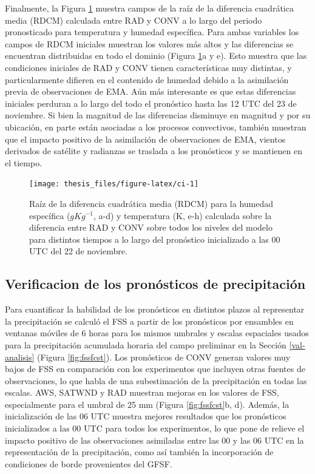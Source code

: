 \documentclass[12pt,oneside,a4paper]{reedthesis}
\begin{document}
Finalmente, la Figura \ref{fig:ci} muestra campos de la raíz de la diferencia cuadrática media (RDCM) calculada entre RAD y CONV a lo largo del periodo pronosticado para temperatura y humedad específica. Para ambas variables los campos de RDCM iniciales muestran los valores más altos y las diferencias se encuentran distribuidas en todo el dominio (Figura \ref{fig:ci}a y e). Esto muestra que las condiciones iniciales de RAD y CONV tienen características muy distintas, y particularmente difieren en el contenido de humedad debido a la asimilación previa de observaciones de EMA. Aún más interesante es que estas diferencias iniciales perduran a lo largo del todo el pronóstico hasta las 12 UTC del 23 de noviembre. Si bien la magnitud de las diferencias disminuye en magnitud y por su ubicación, en parte están asociadas a los procesos convectivos, también muestran que el impacto positivo de la asimilación de observaciones de EMA, vientos derivados de satélite y radianzas se traslada a los pronósticos y se mantienen en el tiempo.


\begin{figure}
\texttt{[image: thesis\_files/figure-latex/ci-1]} \caption{Raíz de la diferencia cuadrática media (RDCM) para la humedad específica (\(gKg^{-1}\), a-d) y temperatura (K, e-h) calculada sobre la diferencia entre RAD y CONV sobre todos los niveles del modelo para distintos tiempos a lo largo del pronóstico inicializado a las 00 UTC del 22 de noviembre.}\label{fig:ci}
\end{figure}
\hypertarget{verificacion-de-los-pronuxf3sticos-de-precipitaciuxf3n}{%
\subsection{Verificacion de los pronósticos de precipitación}\label{verificacion-de-los-pronuxf3sticos-de-precipitaciuxf3n}}

Para cuantificar la habilidad de los pronósticos en distintos plazos al representar la precipitación se calculó el FSS a partir de los pronósticos por ensambles en ventanas móviles de 6 horas para los mismos umbrales y escalas espaciales usados para la precipitación acumulada horaria del campo preliminar en la Sección \ref{val-analisis} (Figura \ref{fig:fssfcst}). Los pronósticos de CONV generan valores muy bajos de FSS en comparación con los experimentos que incluyen otras fuentes de observaciones, lo que habla de una subestimación de la precipitación en todas las escalas. AWS, SATWND y RAD muestran mejoras en los valores de FSS, especialmente para el umbral de 25 mm (Figura \ref{fig:fssfcst}b, d). Además, la inicialización de las 06 UTC muestra mejores resultados que los pronósticos inicializados a las 00 UTC para todos los experimentos, lo que pone de relieve el impacto positivo de las observaciones asimiladas entre las 00 y las 06 UTC en la representación de la precipitación, como así también la incorporación de condiciones de borde provenientes del GFSF.
\end{document}
